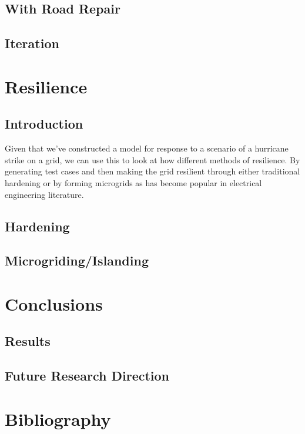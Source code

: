 \documentclass{article}
\begin{document}
	\subsection{With Road Repair}
	\subsection{Iteration}
	\section{Resilience}
	\subsection{Introduction}
	Given that we've constructed a model for response to a scenario of a hurricane strike on a grid, we can use this to look at how different methods of resilience. By generating test cases and then making the grid resilient through either traditional hardening or by forming microgrids as has become popular in electrical engineering literature.
	\subsection{Hardening}
	\subsection{Microgriding/Islanding}
	\section{Conclusions}
	\subsection{Results}
	\subsection{Future Research Direction}
	\section{Bibliography}
	
	
\end{document}
